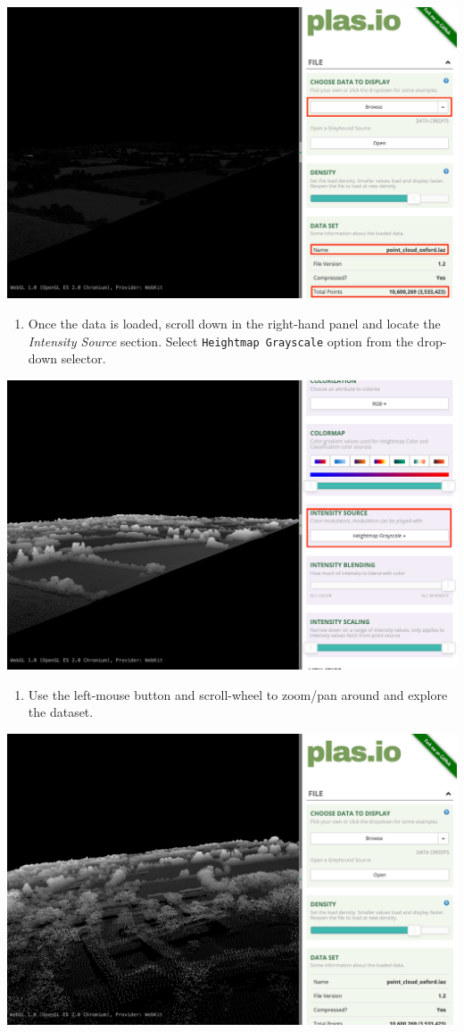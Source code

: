 \documentclass[
  12pt,
  a4paper]{article}
\providecommand{\tightlist}{%
  \setlength{\itemsep}{0pt}\setlength{\parskip}{0pt}}
\begin{document}
\begin{center}\includegraphics[width=0.75\linewidth]{images/spatial_data_viz/pointcloud1} \end{center}

\begin{enumerate}
\def\labelenumi{\arabic{enumi}.}
\setcounter{enumi}{1}
\tightlist
\item
  Once the data is loaded, scroll down in the right-hand panel and
  locate the \emph{Intensity Source} section. Select
  \texttt{Heightmap\ Grayscale} option from the drop-down selector.
\end{enumerate}

\begin{center}\includegraphics[width=0.75\linewidth]{images/spatial_data_viz/pointcloud2} \end{center}

\begin{enumerate}
\def\labelenumi{\arabic{enumi}.}
\setcounter{enumi}{2}
\tightlist
\item
  Use the left-mouse button and scroll-wheel to zoom/pan around and
  explore the dataset.
\end{enumerate}

\begin{center}\includegraphics[width=0.75\linewidth]{images/spatial_data_viz/pointcloud3} \end{center}
\end{document}
